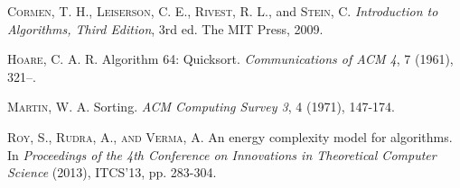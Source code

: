 \documentclass[a4paper, 10pt,twocolumn]{article}
\begin{document}
\begin{thebibliography}{25}
 \textsc{Cormen}, T. H., \textsc{Leiserson}, C. E., \textsc{Rivest},
    R. L., and \textsc{Stein}, C. \textit{Introduction to Algorithms,
    Third Edition}, 3rd ed. The MIT Press,
    2009.


\textsc{Hoare}, C. A. R. Algorithm 64: Quicksort.
    \textit{Communications of ACM 4}, 7 (1961), 321\mbox{–}.


\textsc{Martin}, W. A. Sorting. \textit{ACM             Computing Survey 3}, 4 (1971), 147\mbox{-}174.


\textsc{Roy}, S., \textsc{Rudra}, A., \textsc{and} \textsc{Verma}, A. An energy
    complexity model for algorithms. In \textit {Proceedings
    of the 4th Conference on Innovations
    in Theoretical Computer Science} (2013), ITCS\mbox{'}13, pp. 283\mbox{-}304.

\end{thebibliography}
\end{document}

